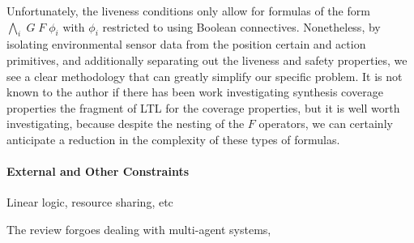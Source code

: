 \documentclass[a4paper, 11pt]{article}
\begin{document}
Unfortunately, the liveness conditions only allow for formulas of the form
$\underset{i}{\bigwedge}\;G\; F\; \phi_i$ with $\phi_i$ restricted to using
Boolean connectives. Nonetheless, by isolating environmental sensor data from
the position certain and action primitives, and additionally separating out the liveness
and safety properties, we see a clear methodology that can greatly simplify our
specific problem. It is not known to the author if there has been work
investigating synthesis coverage properties the fragment of LTL for the coverage
properties, but it is well worth investigating, because despite the nesting of
the $F$ operators, we can certainly anticipate a reduction in the complexity of
these types of formulas.




\paragraph{External and Other Constraints}

Linear logic, resource sharing, etc

The review \cite{synthGazit} forgoes dealing with multi-agent systems, 

\end{document}

